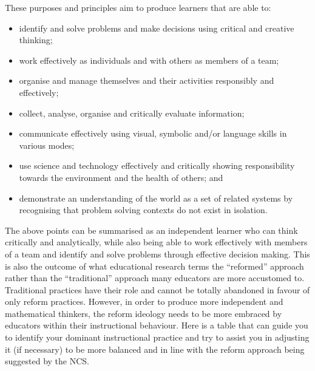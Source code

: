 These purposes and principles aim to produce learners that are able to: 
\begin{itemize}[noitemsep]
\item identify and solve problems and make decisions using critical and creative thinking; 
\item work effectively as individuals and with others as members of a team; 
\item organise and manage themselves and their activities responsibly and effectively; 
\item collect, analyse, organise and critically evaluate information; 
\item communicate effectively using visual, symbolic and/or language skills in various modes; 
\item use science and technology effectively and critically showing responsibility towards the environment and the health of others; and 
\item demonstrate an understanding of the world as a set of related systems by recognising that problem solving contexts do not exist in isolation. 
\end{itemize}
The above points can be summarised as an independent learner who can think critically and analytically, while also being able to work effectively with members of a team and identify and solve problems through effective decision making. This is also the outcome of what educational research terms the “reformed” approach rather than the “traditional” approach many educators are more accustomed to. Traditional practices have their role and cannot be totally abandoned in favour of only reform practices. However, in order to produce more independent and mathematical thinkers, the reform ideology needs to be more embraced by educators within their instructional behaviour. Here is a table that can guide you to identify your dominant instructional practice and try to assist you in adjusting it (if necessary) to be more balanced and in line with the reform approach being suggested by the NCS. 

